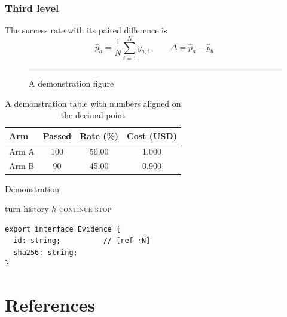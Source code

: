 \documentclass[a4paper,romanchapters,chapterbreak]{fptthesis}
\begin{document}
\subsection{Third level}\label{sec:three}
The success rate with its paired difference is
\begin{equation}\label{eq:demo}
  \hat{p}_a=\frac{1}{N}\sum_{i=1}^{N} y_{a,i},\qquad \Delta=\hat{p}_a-\hat{p}_b .
\end{equation}
\begin{figure}[H]
  \centering\rule{0.6\textwidth}{2.5cm}
  \caption{A demonstration figure}\label{fig:demo}
\end{figure}
\begin{table}[H]
  \centering
  \caption{A demonstration table with numbers aligned on the decimal point}\label{tab:demo}
  \begin{tabularx}{\textwidth}{@{}L S[table-format=3.0] S[table-format=2.2] S[table-format=1.3]@{}}
    \toprule
    {Arm} & {Passed} & {Rate (\%)} & {Cost (USD)}\\
    \midrule
    Arm A & 100 & 50.00 & 1.000\\
    Arm B & 90 & 45.00 & 0.900\\
    \bottomrule
  \end{tabularx}
\end{table}
\begin{algorithm}[H]
  \caption{Demonstration}\label{alg:demo}
  \begin{algorithmic}[1]
    \Require turn history $h$
       \State \Return \textsc{continue} \EndIf
      \State \Return \textsc{stop}
    \EndFunction
  \end{algorithmic}
\end{algorithm}
\begin{lstlisting}[float=htb,caption={A demonstration listing},label={lst:demo}]
export interface Evidence {
  id: string;          // [ref rN]
  sha256: string;
}
\end{lstlisting}
\chapter{References}
\printbibliography[heading=none]
\end{document}
